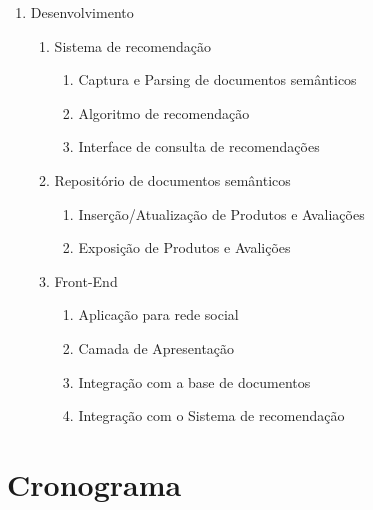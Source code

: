\documentclass[]{article}
\begin{document}
\begin{enumerate}
	\item Desenvolvimento
	\begin{enumerate}
		\item Sistema de recomendação
		\begin{enumerate}
			\item Captura e Parsing de documentos semânticos
			\item Algoritmo de recomendação
			\item Interface de consulta de recomendações
		\end{enumerate}
		\item Repositório de documentos semânticos
		\begin{enumerate}
		  \item Inserção/Atualização de Produtos e Avaliações
		  \item Exposição de Produtos e Avalições
		\end{enumerate}
		\item Front-End
		\begin{enumerate}
			\item Aplicação para rede social
			\item Camada de Apresentação
			\item Integração com a base de documentos
			\item Integração com o Sistema de recomendação
		\end{enumerate}
	\end{enumerate}
	
\end{enumerate}

\section{Cronograma} %
\label{sec:cronograma}
\end{document}
